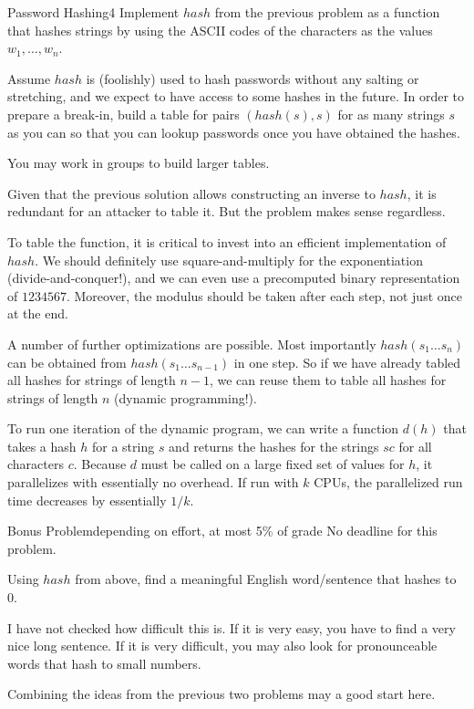\documentclass[a4paper]{article}
\begin{document}
\begin{problem}{Password Hashing}{4}
Implement $hash$ from the previous problem as a function that hashes strings by using the ASCII codes of the characters as the values $w_1,\ldots,w_n$.

Assume $hash$ is (foolishly) used to hash passwords without any salting or stretching, and we expect to have access to some hashes in the future.
In order to prepare a break-in, build a table for pairs $(hash(s),s)$ for as many strings $s$ as you can so that you can lookup passwords once you have obtained the hashes.

You may work in groups to build larger tables.

\begin{solution}
Given that the previous solution allows constructing an inverse to $hash$, it is redundant for an attacker to table it.
But the problem makes sense regardless.

To table the function, it is critical to invest into an efficient implementation of $hash$.
We should definitely use square-and-multiply for the exponentiation (divide-and-conquer!), and we can even use a precomputed binary representation of $1234567$.
Moreover, the modulus should be taken after each step, not just once at the end.

A number of further optimizations are possible.
Most importantly $hash(s_1\ldots s_n)$ can be obtained from $hash(s_1\ldots s_{n-1})$ in one step.
So if we have already tabled all hashes for strings of length $n-1$, we can reuse them to table all hashes for strings of length $n$ (dynamic programming!).

To run one iteration of the dynamic program, we can write a function $d(h)$ that takes a hash $h$ for a string $s$ and returns the hashes for the strings $sc$ for all characters $c$.
Because $d$ must be called on a large fixed set of values for $h$, it parallelizes with essentially no overhead.
If run with $k$ CPUs, the parallelized run time decreases by essentially $1/k$.
\end{solution}
\end{problem}


\begin{problem}{Bonus Problem}{depending on effort, at most 5\% of grade}
No deadline for this problem.

Using $hash$ from above, find a meaningful English word/sentence that hashes to $0$.

I have not checked how difficult this is.
If it is very easy, you have to find a very nice long sentence.
If it is very difficult, you may also look for pronounceable words that hash to small numbers.

\begin{solution}
Combining the ideas from the previous two problems may a good start here.
\end{solution}
\end{problem}
\end{document}
